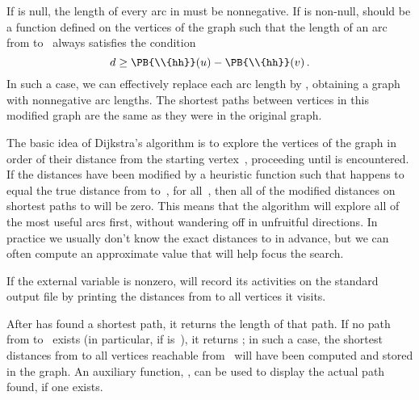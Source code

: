 If  is null, the length of
every arc in  must be nonnegative. If  is non-null,  should be
a function defined on the vertices of the graph such that the
length  of an arc from  to~ always satisfies the
condition
$$ d \ge \PB{\\{hh}}(u)-\PB{\\{hh}}(v)\,. $$
In such a case, we can effectively replace each arc length  by
, obtaining a graph with nonnegative arc
lengths.
The shortest paths between vertices in this modified graph
are the same as they were in the original graph.

The basic idea of Dijkstra's algorithm is to explore the vertices of
the graph in order of their distance from the starting vertex~,
proceeding until  is encountered. If the distances have been
modified by a heuristic function  such that  happens
to equal
the true distance from  to~, for all~,
then all of the modified distances on
shortest paths to  will be zero. This means that the algorithm
will explore all of the most useful arcs first, without
wandering off in unfruitful directions. In practice we usually
don't know the exact distances to  in advance, but we can often
compute an approximate value  that will help focus the search.

If the external variable  is nonzero,  will
record
its activities on the standard output file by printing the distances
from  to all vertices it visits.

After  has found a shortest path, it returns the length of
that path. If no path from  to~ exists (in particular, if
 is~\PB{$\NULL$}), it returns ; in such a case, the
shortest distances from
 to all vertices reachable from~ will have been computed
and
stored in the graph.
An auxiliary function, , can be used
to display the actual path found, if one exists.

